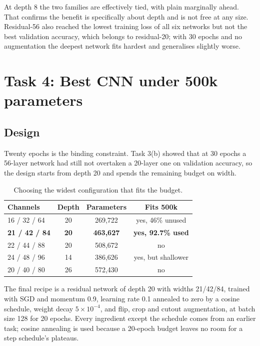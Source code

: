\documentclass[11pt,a4paper]{article}
\begin{document}
At depth 8 the two families are effectively tied, with plain marginally ahead.
That confirms the benefit is specifically about depth and is not free at any
size. Residual-56 also reached the lowest training loss of all six networks but
not the best validation accuracy, which belongs to residual-20; with 30 epochs
and no augmentation the deepest network fits hardest and generalises slightly
worse.

\section{Task 4: Best CNN under 500k parameters}

\subsection{Design}

Twenty epochs is the binding constraint. Task 3(b) showed that at 30 epochs a
56-layer network had still not overtaken a 20-layer one on validation accuracy,
so the design starts from depth 20 and spends the remaining budget on width.

\begin{table}[H]
\centering\small
\caption{Choosing the widest configuration that fits the budget.}
\begin{tabular}{lccc}
\toprule
Channels & Depth & Parameters & Fits 500k \\
\midrule
16 / 32 / 64          & 20 & 269{,}722 & yes, 46\% unused \\
\textbf{21 / 42 / 84} & \textbf{20} & \textbf{463{,}627} & \textbf{yes, 92.7\% used} \\
22 / 44 / 88          & 20 & 508{,}672 & no \\
24 / 48 / 96          & 14 & 386{,}626 & yes, but shallower \\
20 / 40 / 80          & 26 & 572{,}430 & no \\
\bottomrule
\end{tabular}
\end{table}

The final recipe is a residual network of depth 20 with widths 21/42/84, trained
with SGD and momentum 0.9, learning rate 0.1 annealed to zero by a cosine
schedule, weight decay $5\times10^{-4}$, and flip, crop and cutout augmentation,
at batch size 128 for 20 epochs. Every ingredient except the schedule comes from
an earlier task; cosine annealing is used because a 20-epoch budget leaves no
room for a step schedule's plateaus.
\end{document}
